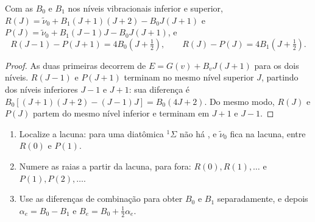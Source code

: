 \begin{theorem}\label{thm:b3:rovibrational-spectroscopy:combination-differences}
Com as  $B_0$ e $B_1$ nos níveis vibracionais inferior e
superior, $R(J) = \tilde\nu_0 + B_1(J+1)(J+2) - B_0J(J+1)$ e $P(J) = \tilde\nu_0 +
B_1(J-1)J - B_0J(J+1)$, e
\[
R(J - 1) - P(J + 1) = 4B_0(J + \tfrac12), \qquad R(J) - P(J) = 4B_1(J + \tfrac12).
\]
\end{theorem}

\begin{proof}
As duas primeiras decorrem de $E = G(v) + B_vJ(J+1)$ para os dois níveis. $R(J - 1)$ e
$P(J + 1)$ terminam no mesmo nível superior $J$, partindo dos níveis inferiores $J - 1$ e $J + 1$:
sua diferença é $B_0[(J+1)(J+2) - (J-1)J] = B_0(4J + 2)$. Do mesmo modo, $R(J)$ e
$P(J)$ partem do mesmo nível inferior e terminam em $J + 1$ e $J - 1$.
\end{proof}

\begin{method}\label{met:b3:rovibrational-spectroscopy:combination}
\begin{enumerate}
  \item Localize a lacuna: para uma diatômica ${}^1\Sigma$ não há , e
        $\tilde\nu_0$ fica na lacuna, entre $R(0)$ e $P(1)$.
  \item Numere as raias a partir da lacuna, para fora: $R(0), R(1), \dots$ e $P(1),
        P(2), \dots$.
  \item Use as diferenças de combinação para obter $B_0$ e $B_1$
        separadamente, e depois $\alpha_e = B_0 - B_1$ e $B_e = B_0 + \frac12\alpha_e$.
\end{enumerate}
\end{method}

